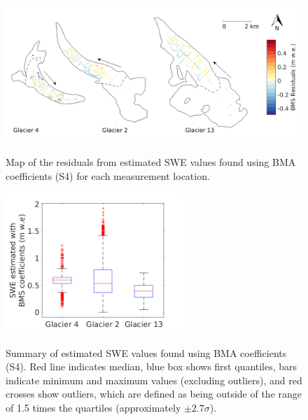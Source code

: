 \documentclass{sfuthesis}
\newcommand{\boxMatlab}{Red line indicates median, blue box shows first quantiles, bars indicate minimum and maximum values (excluding outliers), and red crosses show outliers, which are defined as being outside of the range of 1.5 times the quartiles (approximately $\pm2.7\sigma$). }
\begin{document}
\begin{figure}[H]
	\centering
	\includegraphics[width =\textwidth]{residualsMap_BMS.png}\\
	\caption{Map of the residuals from estimated SWE values found using BMA coefficients (S4) for each measurement location.}
	\label{fig:BMS_residualsMap}
\end{figure} 


\begin{figure}[H]
\centering
	\includegraphics[width =0.6\textwidth]{ModelledSWE_box_BMS.png}\\
\caption{Summary of estimated SWE values found using BMA coefficients (S4). \boxMatlab}
\label{fig:BMAsweboxplot}
\end{figure} 
\end{document}
